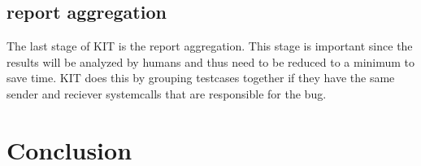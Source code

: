 \documentclass[10pt,twocolumn,a4paper]{article}
\begin{document}
\subsection{report aggregation}
The last stage of KIT is the report aggregation. This stage is important since the results will be
analyzed by humans and thus need to be reduced to a minimum to save time. KIT does this by grouping
testcases together if they have the same sender and reciever systemcalls that are responsible for
the bug. 
\section{Conclusion}\label{sec:conclusion}



\end{document}
